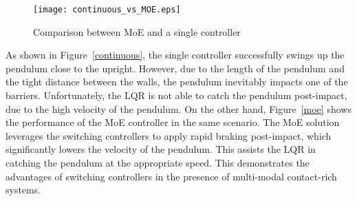 \begin{figure}[tb]
    \centering
    \texttt{[image: continuous\_vs\_MOE.eps]}
    \caption{Comparison between MoE and a single controller}
    \label{fig:contandmoe}
\end{figure}
%
As shown in Figure~\ref{continuous}, the single controller
successfully swings up the pendulum close to the upright.
%
However, due to the length of the pendulum and the tight distance between the
walls, the pendulum inevitably impacts one of the barriers. 
%
Unfortunately, the LQR is not able to catch the pendulum post-impact, due to the
high velocity of the pendulum.
%
On the other hand, Figure~\ref{moe} shows the performance of the MoE
controller in the same scenario.
%
The MoE solution leverages the switching controllers to apply rapid braking
post-impact, which significantly lowers the velocity of the pendulum. 
%
This assists the LQR in catching the pendulum at the appropriate speed.
%
This demonstrates the advantages of switching controllers in the presence of
multi-modal contact-rich systems.
